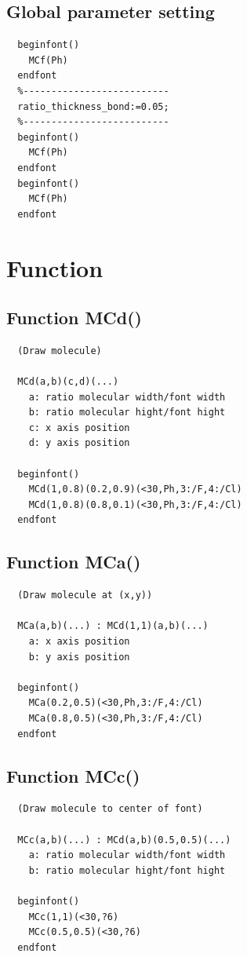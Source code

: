\documentclass[a4paper]{article}
\makeatletter
\def\MCFstructure{\hspace{5mm}{\@strufont\char\fontnum}\advance\fontnum\@ne\relax}%
\makeatother
\begin{document}
\subsection{Global parameter setting}
\begin{verbatim}
  beginfont()
    MCf(Ph)
  endfont
  %--------------------------
  ratio_thickness_bond:=0.05;
  %--------------------------
  beginfont()
    MCf(Ph)
  endfont
  beginfont()
    MCf(Ph)
  endfont
\end{verbatim}
\MCFstructure\MCFstructure\MCFstructure
\newpage
\section{Function}
\subsection{Function MCd()}
\begin{verbatim}
  (Draw molecule)

  MCd(a,b)(c,d)(...)
    a: ratio molecular width/font width
    b: ratio molecular hight/font hight
    c: x axis position
    d: y axis position

  beginfont()
    MCd(1,0.8)(0.2,0.9)(<30,Ph,3:/F,4:/Cl)
    MCd(1,0.8)(0.8,0.1)(<30,Ph,3:/F,4:/Cl)
  endfont
\end{verbatim}
\MCFstructure
\subsection{Function MCa()}
\begin{verbatim}
  (Draw molecule at (x,y))

  MCa(a,b)(...) : MCd(1,1)(a,b)(...)
    a: x axis position
    b: y axis position

  beginfont()
    MCa(0.2,0.5)(<30,Ph,3:/F,4:/Cl)
    MCa(0.8,0.5)(<30,Ph,3:/F,4:/Cl)
  endfont
\end{verbatim}
\MCFstructure
\subsection{Function MCc()}
\begin{verbatim}
  (Draw molecule to center of font)

  MCc(a,b)(...) : MCd(a,b)(0.5,0.5)(...)
    a: ratio molecular width/font width
    b: ratio molecular hight/font hight

  beginfont()
    MCc(1,1)(<30,?6)
    MCc(0.5,0.5)(<30,?6)
  endfont
\end{verbatim}
\MCFstructure
\end{document}
